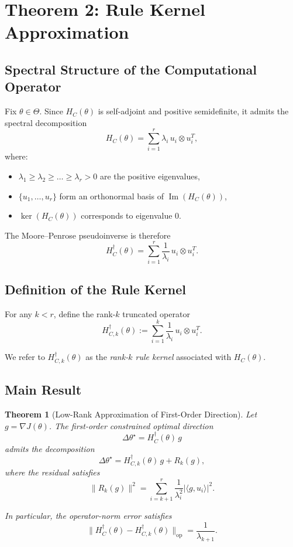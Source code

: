 \documentclass[11pt,a4paper,twocolumn]{article}
\newtheorem{theorem}{Theorem}
\begin{document}
 \section{Theorem 2: Rule Kernel Approximation}
 
 \subsection{Spectral Structure of the Computational Operator}
 
 Fix $\theta \in \Theta$.
 Since $H_C(\theta)$ is self-adjoint and positive semidefinite,
 it admits the spectral decomposition
 \[
 H_C(\theta)
 =
 \sum_{i=1}^{r} \lambda_i \, u_i \otimes u_i^T,
 \]
 where:
 
 \begin{itemize}
  \item $\lambda_1 \ge \lambda_2 \ge \dots \ge \lambda_r > 0$ are the positive eigenvalues,
  \item $\{u_1,\dots,u_r\}$ form an orthonormal basis of $\operatorname{Im}(H_C(\theta))$,
  \item $\ker(H_C(\theta))$ corresponds to eigenvalue $0$.
 \end{itemize}
 
 The Moore–Penrose pseudoinverse is therefore
 \[
 H_C^\dagger(\theta)
 =
 \sum_{i=1}^{r}
 \frac{1}{\lambda_i}\,
 u_i \otimes u_i^T.
 \]
 
 \subsection{Definition of the Rule Kernel}
 
 For any $k < r$, define the rank-$k$ truncated operator
 \[
 H_{C,k}^\dagger(\theta)
 :=
 \sum_{i=1}^{k}
 \frac{1}{\lambda_i}\,
 u_i \otimes u_i^T.
 \]
 
 We refer to $H_{C,k}^\dagger(\theta)$ as the
 \emph{rank-$k$ rule kernel} associated with $H_C(\theta)$.
 
 \subsection{Main Result}
 
 \begin{theorem}[Low-Rank Approximation of First-Order Direction]
  \label{thm:rulekernel}
  Let $g = \nabla J(\theta)$.
  The first-order constrained optimal direction
  \[
  \Delta\theta^\star
  =
  H_C^\dagger(\theta)\, g
  \]
  admits the decomposition
  \[
  \Delta\theta^\star
  =
  H_{C,k}^\dagger(\theta)\, g
  +
  R_k(g),
  \]
  where the residual satisfies
  \begin{equation}
   \|R_k(g)\|^2
   =
   \sum_{i=k+1}^{r}
   \frac{1}{\lambda_i^2}
   |\langle g,u_i\rangle|^2.
  \end{equation}
  
  In particular, the operator-norm error satisfies
  \[
  \| H_C^\dagger(\theta) - H_{C,k}^\dagger(\theta) \|_{\mathrm{op}}
  =
  \frac{1}{\lambda_{k+1}}.
  \]
 \end{theorem}
 
\end{document}
